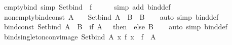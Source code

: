 \begin{isabellebody}
\endisatagproof
{\isafoldproof}%
%
\isadelimproof
\isanewline
%
\endisadelimproof
\isanewline
{}\isamarkupfalse%
\ empty{\isacharunderscore}{\kern0pt}bind\ {\isacharbrackleft}{\kern0pt}simp{\isacharbrackright}{\kern0pt}{\isacharcolon}{\kern0pt}\ {\isachardoublequoteopen}Set{\isachardot}{\kern0pt}bind\ {\isacharbraceleft}{\kern0pt}{\isacharbraceright}{\kern0pt}\ f\ {\isacharequal}{\kern0pt}\ {\isacharbraceleft}{\kern0pt}{\isacharbraceright}{\kern0pt}{\isachardoublequoteclose}\isanewline
%
\isadelimproof
\ \ %
\endisadelimproof
%
\isatagproof
{}\isamarkupfalse%
\ {\isacharparenleft}{\kern0pt}simp\ add{\isacharcolon}{\kern0pt}\ bind{\isacharunderscore}{\kern0pt}def{\isacharparenright}{\kern0pt}%
\endisatagproof
{\isafoldproof}%
%
\isadelimproof
\isanewline
%
\endisadelimproof
\isanewline
{}\isamarkupfalse%
\ nonempty{\isacharunderscore}{\kern0pt}bind{\isacharunderscore}{\kern0pt}const{\isacharcolon}{\kern0pt}\ {\isachardoublequoteopen}A\ {\isasymnoteq}\ {\isacharbraceleft}{\kern0pt}{\isacharbraceright}{\kern0pt}\ {\isasymLongrightarrow}\ Set{\isachardot}{\kern0pt}bind\ A\ {\isacharparenleft}{\kern0pt}{\isasymlambda}{\isacharunderscore}{\kern0pt}{\isachardot}{\kern0pt}\ B{\isacharparenright}{\kern0pt}\ {\isacharequal}{\kern0pt}\ B{\isachardoublequoteclose}\isanewline
%
\isadelimproof
\ \ %
\endisadelimproof
%
\isatagproof
{}\isamarkupfalse%
\ {\isacharparenleft}{\kern0pt}auto\ simp{\isacharcolon}{\kern0pt}\ bind{\isacharunderscore}{\kern0pt}def{\isacharparenright}{\kern0pt}%
\endisatagproof
{\isafoldproof}%
%
\isadelimproof
\isanewline
%
\endisadelimproof
\isanewline
{}\isamarkupfalse%
\ bind{\isacharunderscore}{\kern0pt}const{\isacharcolon}{\kern0pt}\ {\isachardoublequoteopen}Set{\isachardot}{\kern0pt}bind\ A\ {\isacharparenleft}{\kern0pt}{\isasymlambda}{\isacharunderscore}{\kern0pt}{\isachardot}{\kern0pt}\ B{\isacharparenright}{\kern0pt}\ {\isacharequal}{\kern0pt}\ {\isacharparenleft}{\kern0pt}if\ A\ {\isacharequal}{\kern0pt}\ {\isacharbraceleft}{\kern0pt}{\isacharbraceright}{\kern0pt}\ then\ {\isacharbraceleft}{\kern0pt}{\isacharbraceright}{\kern0pt}\ else\ B{\isacharparenright}{\kern0pt}{\isachardoublequoteclose}\isanewline
%
\isadelimproof
\ \ %
\endisadelimproof
%
\isatagproof
{}\isamarkupfalse%
\ {\isacharparenleft}{\kern0pt}auto\ simp{\isacharcolon}{\kern0pt}\ bind{\isacharunderscore}{\kern0pt}def{\isacharparenright}{\kern0pt}%
\endisatagproof
{\isafoldproof}%
%
\isadelimproof
\isanewline
%
\endisadelimproof
\isanewline
{}\isamarkupfalse%
\ bind{\isacharunderscore}{\kern0pt}singleton{\isacharunderscore}{\kern0pt}conv{\isacharunderscore}{\kern0pt}image{\isacharcolon}{\kern0pt}\ {\isachardoublequoteopen}Set{\isachardot}{\kern0pt}bind\ A\ {\isacharparenleft}{\kern0pt}{\isasymlambda}x{\isachardot}{\kern0pt}\ {\isacharbraceleft}{\kern0pt}f\ x{\isacharbraceright}{\kern0pt}{\isacharparenright}{\kern0pt}\ {\isacharequal}{\kern0pt}\ f\ {\isacharbackquote}{\kern0pt}\ A{\isachardoublequoteclose}\isanewline

\end{isabellebody}
